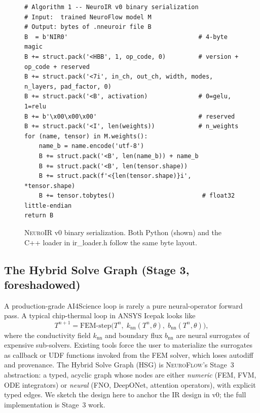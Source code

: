 \documentclass[10pt,twocolumn]{article}
\renewcommand{\texttt}[1]{{\normalfont\ttfamily #1}\normalfont\rmfamily}
\newcommand{\nf}{\textsc{NeuroFlow}}
\newcommand{\neuroir}{\textsc{NeuroIR}}
\begin{document}
\begin{figure}[t]
\centering
\begin{minipage}{0.95\linewidth}
\begin{verbatim}
# Algorithm 1 -- NeuroIR v0 binary serialization
# Input:  trained NeuroFlow model M
# Output: bytes of .nneuroir file B
B  = b'NIR0'                                    # 4-byte magic
B += struct.pack('<HBB', 1, op_code, 0)         # version + op_code + reserved
B += struct.pack('<7i', in_ch, out_ch, width, modes, n_layers, pad_factor, 0)
B += struct.pack('<B', activation)              # 0=gelu, 1=relu
B += b'\x00\x00\x00'                            # reserved
B += struct.pack('<I', len(weights))            # n_weights
for (name, tensor) in M.weights():
    name_b = name.encode('utf-8')
    B += struct.pack('<B', len(name_b)) + name_b
    B += struct.pack('<B', len(tensor.shape))
    B += struct.pack(f'<{len(tensor.shape)}i', *tensor.shape)
    B += tensor.tobytes()                        # float32 little-endian
return B
\end{verbatim}
\end{minipage}
\caption{\neuroir{} v0 binary serialization.  Both Python (shown)
and the C{++} loader in \texttt{ir\_loader.h} follow the same byte
layout.}
\label{alg:neuroir}
\end{figure}

\subsection{The Hybrid Solve Graph (Stage 3, foreshadowed)}

A production-grade AI4Science loop is rarely a pure neural-operator
forward pass.  A typical chip-thermal loop in ANSYS Icepak looks
like
\[
  T^{n+1} = \mathrm{FEM\text{-}step}\bigl(T^n,\; k_{\mathrm{nn}}(T^n,\theta),\;
                                    b_{\mathrm{nn}}(T^n,\theta)\bigr),
\]
where the conductivity field $k_{\mathrm{nn}}$ and boundary flux
$b_{\mathrm{nn}}$ are neural surrogates of expensive sub-solvers.
%
Existing tools force the user to materialize the surrogates as
\texttt{callback} or \texttt{UDF} functions invoked from the FEM
solver, which loses autodiff and provenance.  The Hybrid Solve
Graph (HSG) is \nf{}'s Stage~3 abstraction: a typed, acyclic
graph whose nodes are either \emph{numeric} (FEM, FVM, ODE
integrators) or \emph{neural} (FNO, DeepONet, attention
operators), with explicit typed edges.  We sketch the design here
to anchor the IR design in v0; the full implementation is Stage~3
work.
\end{document}
